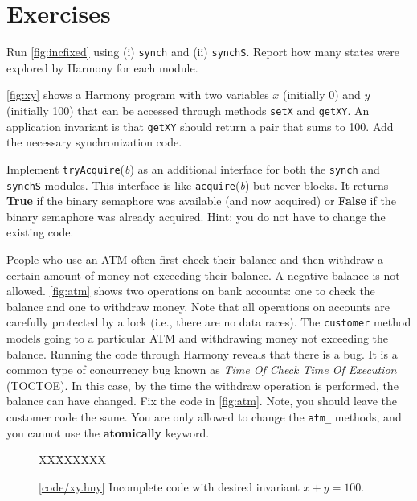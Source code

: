 \documentclass{report}
\newcommand{\harmonysource}[1]{
\begin{tabbing}
XX\=XXX\=XXX\kill
    
\end{tabbing}
}
\newcommand{\harmonylink}[1]{%
[\href{https://harmony.cs.cornell.edu/#1}{\underline{#1}}]%
}
\newenvironment{code}{
\tcolorbox
}{
\endtcolorbox
}
\begin{document}
\section*{Exercises}
\begin{problems}
\item
Run \autoref{fig:incfixed} using (i) \texttt{synch} and (ii) \texttt{synchS}.
Report how many states were explored by Harmony for each module.
\item \label{ex:xy} \autoref{fig:xy} shows a Harmony program with two variables $x$
(initially 0) and $y$ (initially 100) that can be accessed through methods
\texttt{setX} and \texttt{getXY}.  An application invariant is that \texttt{getXY}
should return a pair that sums to 100.  Add the necessary synchronization code.
\item \label{ex:trylock} Implement \texttt{tryAcquire}(\textit{b}) as an additional
interface for both the \texttt{synch} and \texttt{synchS} modules.
This interface is like \texttt{acquire}(\textit{b}) but never blocks.  It
returns \textbf{True} if the binary semaphore was available (and now acquired) or \textbf{False}
if the binary semaphore was already acquired.
Hint: you do not have to change the existing code.
\item People who use an ATM often first check their balance and then withdraw
a certain amount of money not exceeding their balance.  A negative balance
is not allowed.  \autoref{fig:atm} shows two operations on bank accounts:
one to check the balance and one to withdraw money.
Note that all operations on accounts are carefully protected by a lock
(i.e., there are no data races).
The \texttt{customer}
method models going to a particular ATM and withdrawing money not exceeding
the balance.
Running the code through Harmony reveals that there is a bug.
It is a common type of concurrency bug known as \emph{Time Of Check Time Of
Execution} (TOCTOE).
In this case, by the time the withdraw operation is performed,
the balance can have changed.
Fix the code in \autoref{fig:atm}.  Note, you should leave the
customer code the same. You are only allowed to change the
\texttt{atm\_} methods, and you cannot use the \textbf{atomically}
keyword.
\end{problems}

\begin{figure}
\begin{code}
\harmonysource{xy}
\end{code}
\caption{\harmonylink{code/xy.hny} Incomplete code with desired invariant $x + y = 100$.}
\label{fig:xy}
\end{figure}
\end{document}
